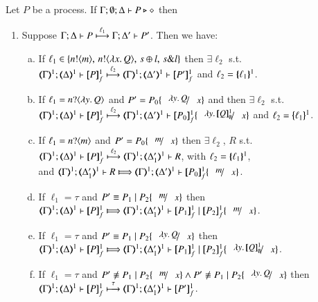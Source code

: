 \begin{proposition}\rm
	\label{prop:op_corr_HOp_to_HO}
	Let $P$ be a \HOp process.
	If $\Gamma; \emptyset; \Delta \proves P \hastype \Proc$ then
	\begin{enumerate}[1.]
		\item
			Suppose $\stytra{\Gamma}{\ell_1}{\Delta}{P}{\Delta'}{P'}$. Then we have:
			\begin{enumerate}[(a)]
		    \item 
			If $\ell_1 \in \{\bactout{n}{m}, \,\bactout{n}{\abs{x}Q}, \,\bactsel{s}{l}, \,\bactbra{s}{l}   \}$
			then $\exists \ell_2$ s.t. \\
			$\stytra{\mapt{\Gamma}^{1}}{\ell_2}{\mapt{\Delta}^{1}}{\pmapp{P}{1}{f}}{\mapt{\Delta'}^{1}}{\pmapp{P'}{1}{f}}$
			and $\ell_2 = \mapa{\ell_1}^{1}$.
			
			\item If $\ell_1 = \bactinp{n}{\abs{y}Q}$ and
			$P' = P_0\subst{\abs{y}Q}{x}$ and			
			then $\exists \ell_2$ s.t. \\
			$\stytra{\mapt{\Gamma}^{1}}{\ell_2}{\mapt{\Delta}^{1}}{\pmapp{P}{1}{f}}{\mapt{\Delta'}^{1}}{\pmapp{P_0}{1}{f}\subst{\abs{y}\pmapp{Q}{1}{\emptyset}}{x}}$
			and $\ell_2 = \mapa{\ell_1}^{1}$.
			
			\item If $\ell_1 = \bactinp{n}{m}$
			and 
			$P' = P_0\subst{m}{x}$
			then $\exists \ell_2$, $R$ s.t. \\
			$\stytra{\mapt{\Gamma}^{1}}{\ell_2}{\mapt{\Delta}^{1}}{\pmapp{P}{1}{f}}{\mapt{\Delta'_1}^{1}}{R}$,
			with $\ell_2 = \mapa{\ell_1}^{1}$, \\
			and
			$\wtytra{\mapt{\Gamma}^{1}}{}{\mapt{\Delta'_1}^{1}}{R}{\mapt{\Delta'}^{1}}{\pmapp{P_0}{1}{f}\subst{m}{x}}$.	
						
			\item If $\ell_1 = \tau$
			and $P' \scong P_1 \Par P_2\subst{m}{x}$
			then 
			$\wtytra{\mapt{\Gamma}^{1}}{}{\mapt{\Delta}^{1}}{\pmapp{P}{1}{f}}{\mapt{\Delta'_1}^{1}}{\pmapp{P_1}{1}{f}
			\Par \pmapp{P_2}{1}{f}\subst{m}{x}
			}$.
			
			\item If $\ell_1 = \tau$
			and $P' \scong P_1 \Par P_2\subst{\abs{y}Q}{x}$
			then \\
			$\wtytra{\mapt{\Gamma}^{1}}{}{\mapt{\Delta}^{1}}{\pmapp{P}{1}{f}}{\mapt{\Delta'_1}^{1}}{\pmapp{P_1}{1}{f}
			\Par \pmapp{P_2}{1}{f}\subst{\abs{y}\pmapp{Q}{1}{\emptyset}}{x}
			}$.
			
			\item If $\ell_1 = \tau$
			and $P' \not\scong P_1 \Par P_2\subst{m}{x} \land P' \not\scong P_1 \Par P_2\subst{\abs{y}Q}{x}$
			then \\
			$\stytra{\mapt{\Gamma}^{1}}{\tau}{\mapt{\Delta}^{1}}{\pmapp{P}{1}{f}}{\mapt{\Delta'_1}^{1}}{ \pmapp{P'}{1}{f}
			}$.


\end{enumerate}
\end{enumerate}
\end{proposition}
